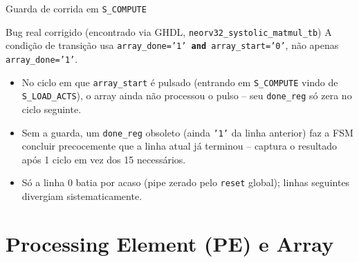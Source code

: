 \documentclass[aspectratio=169,10pt]{beamer}
\begin{document}
\begin{frame}[fragile]{Guarda de corrida em \texttt{S\_COMPUTE}}
  \begin{alertblock}{Bug real corrigido (encontrado via GHDL, \texttt{neorv32\_systolic\_matmul\_tb})}
    A condição de transição usa \texttt{array\_done='1' \textbf{and} array\_start='0'},
    não apenas \texttt{array\_done='1'}.
  \end{alertblock}
  \begin{itemize}
    \item No ciclo em que \texttt{array\_start} é pulsado (entrando em
      \texttt{S\_COMPUTE} vindo de \texttt{S\_LOAD\_ACTS}), o array ainda não
      processou o pulso -- seu \texttt{done\_reg} só zera no ciclo seguinte.
    \item Sem a guarda, um \texttt{done\_reg} obsoleto (ainda \texttt{'1'} da
      linha anterior) faz a FSM concluir precocemente que a linha atual já
      terminou -- captura o resultado após 1 ciclo em vez dos 15 necessários.
    \item Só a linha 0 batia por acaso (pipe zerado pelo \texttt{reset} global);
      linhas seguintes divergiam sistematicamente.
  \end{itemize}
\end{frame}

\section{Processing Element (PE) e Array}
\end{document}
